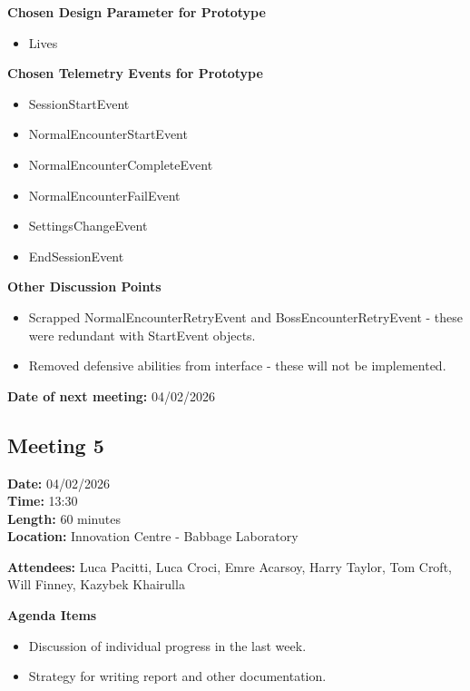 \documentclass[11pt]{article}
\begin{document}
    \textbf{Chosen Design Parameter for Prototype}
    \begin{itemize}
        \item Lives
    \end{itemize}

    \textbf{Chosen Telemetry Events for Prototype}
    \begin{itemize}
        \item SessionStartEvent
        \item NormalEncounterStartEvent
        \item NormalEncounterCompleteEvent
        \item NormalEncounterFailEvent
        \item SettingsChangeEvent
        \item EndSessionEvent
    \end{itemize}

    \textbf{Other Discussion Points}
    \begin{itemize}
        \item Scrapped NormalEncounterRetryEvent and BossEncounterRetryEvent - these were redundant with StartEvent objects.
        \item Removed defensive abilities from interface - these will not be implemented.
    \end{itemize}

    \textbf{Date of next meeting:} 04/02/2026



    \vspace{1.5\baselineskip}
    \subsection{Meeting 5}

    \textbf{Date:} 04/02/2026 \\
    \textbf{Time:} 13:30 \\
    \textbf{Length:} 60 minutes \\
    \textbf{Location:} Innovation Centre - Babbage Laboratory

    \textbf{Attendees:} Luca Pacitti, Luca Croci, Emre Acarsoy, Harry Taylor, Tom Croft, Will Finney, Kazybek Khairulla

    \textbf{Agenda Items}
    \begin{itemize}
        \item Discussion of individual progress in the last week.
        \item Strategy for writing report and other documentation.
    \end{itemize}
\end{document}
